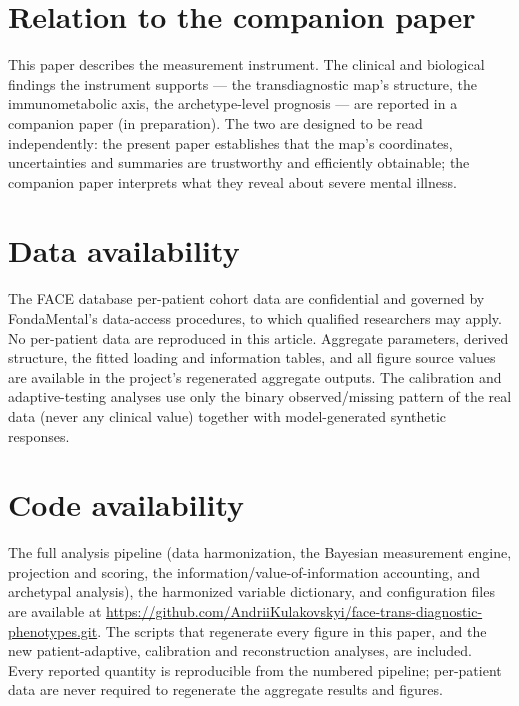 
\section*{Relation to the companion paper}
This paper describes the measurement instrument. The clinical and biological
findings the instrument supports --- the transdiagnostic map's structure, the
immunometabolic axis, the archetype-level prognosis --- are reported in a companion
paper (in preparation). The two are designed to be read independently: the present
paper establishes that the map's coordinates, uncertainties and summaries are
trustworthy and efficiently obtainable; the companion paper interprets what they
reveal about severe mental illness.

\section*{Data availability}
The FACE database per-patient cohort data are confidential and governed by
FondaMental's data-access procedures, to which qualified researchers may apply. No
per-patient data are reproduced in this article. Aggregate parameters, derived
structure, the fitted loading and information tables, and all figure source values
are available in the project's regenerated aggregate outputs. The calibration and
adaptive-testing analyses use only the binary observed/missing pattern of the real
data (never any clinical value) together with model-generated synthetic responses.

\section*{Code availability}
The full analysis pipeline (data harmonization, the Bayesian measurement engine,
projection and scoring, the information/value-of-information accounting, and
archetypal analysis), the harmonized variable dictionary, and configuration files
are available at
\url{https://github.com/AndriiKulakovskyi/face-trans-diagnostic-phenotypes.git}.
The scripts that regenerate every figure in this paper, and the new
patient-adaptive, calibration and reconstruction analyses, are included. Every
reported quantity is reproducible from the numbered pipeline; per-patient data are
never required to regenerate the aggregate results and figures.


